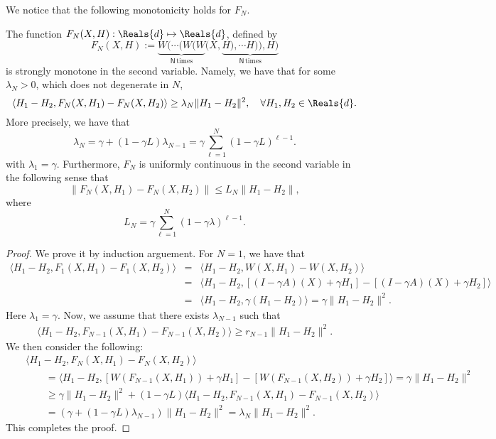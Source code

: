 \begin{itemize}
We notice that the following monotonicity holds for $F_N$. 
\begin{lemma}
The function $F_N(X,H) : \Reals{d} \mapsto \Reals{d}$, defined by 
\begin{equation}
F_N(X,H) := \underbrace{W(\cdots (W(W}_{\textsf{N} \, \mbox{times}}(X, \underbrace{H), \cdots H)),H)}_{\textsf{N}\, \mbox{times}}
\end{equation}
is strongly monotone in the second variable. Namely, we have that for some $\lambda_N > 0$, which does not degenerate in $N$,  
\begin{equation}
\langle H_1 - H_2, F_N(X,H_1) - F_N(X,H_2) \rangle \geq \lambda_N \|H_1 - H_2\|^2, \quad \forall H_1, H_2 \in \Reals{d}.
\end{equation}
More precisely, we have that 
\begin{equation} 
\lambda_N = \gamma + (1 - \gamma L) \lambda_{N-1} = \gamma \sum_{\ell=1}^N (1 - \gamma L)^{\ell-1}.  
\end{equation} 
with $\lambda_1 = \gamma$. Furthermore, $F_N$ is uniformly continuous in the second variable in the following sense that
\begin{equation}
\|F_N(X,H_1) - F_N(X,H_2)\| \leq L_{N} \|H_1 - H_2\|,  
\end{equation}
where 
\begin{equation} 
L_{N} = \gamma \sum_{\ell = 1}^{N} (1 - \gamma \lambda)^{\ell-1}. 
\end{equation} 
\end{lemma}
\begin{proof}
We prove it by induction arguement. For $N = 1$, we have that 
\begin{eqnarray*}
\langle H_1 - H_2, F_1(X,H_1) - F_1(X,H_2) \rangle &=& \langle H_1 - H_2, W(X,H_1) - W(X,H_2) \rangle \\ 
&=& \langle H_1 - H_2, [(I - \gamma A)(X)  + \gamma H_1] - [(I - \gamma A)(X) + \gamma H_2] \rangle \\
&=& \langle H_1 - H_2, \gamma (H_1 - H_2) \rangle = \gamma \|H_1 - H_2\|^2. 
\end{eqnarray*}
Here $\lambda_1 = \gamma$. Now, we assume that there exists $\lambda_{N-1}$ such that 
\begin{eqnarray*}
\langle H_1 - H_2, F_{N-1}(X,H_1) - F_{N-1}(X,H_2) \rangle \geq r_{N-1} \|H_1 - H_2\|^2. 
\end{eqnarray*}
We then consider the following: 
\begin{eqnarray*}
&& \langle H_1 - H_2, F_N(X,H_1) - F_N(X,H_2) \rangle \\
&& \qquad = \langle H_1 - H_2, [W(F_{N-1}(X,H_1)) + \gamma H_1] - [W(F_{N-1}(X,H_2)) + \gamma H_2] \rangle = \gamma \|H_1 - H_2\|^2 \\
&& \qquad \geq \gamma \|H_1 - H_2\|^2 + (1 - \gamma L ) \langle H_1 - H_2, F_{N-1}(X,H_1) - F_{N-1}(X,H_2) \rangle \\
&& \qquad = (\gamma + (1 - \gamma L) \lambda_{N-1}) \|H_1 - H_2\|^2 = \lambda_N \|H_1 - H_2\|^2. 
\end{eqnarray*}
This completes the proof. 
\end{proof}



\end{itemize}
